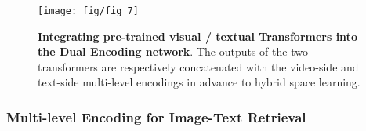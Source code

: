 \begin{figure}[tb!]
\centering\texttt{[image: fig/fig\_7]}
\vspace{-3mm}
\caption{\textbf{Integrating pre-trained visual / textual Transformers into the Dual Encoding network}. The outputs of the two transformers are respectively concatenated with the video-side and text-side multi-level encodings in advance to hybrid space learning. }\label{fig:with_transformer}
\end{figure}




\subsubsection{Multi-level Encoding for Image-Text Retrieval}


\begin{table} [tb!]
\renewcommand{\arraystretch}{1.2}
\caption{\textbf{Performance of image-text retrieval on Flickr30k and MSCOCO}. The proposed text-side multi-level encoding (MLE) is beneficial for VSE++~\cite{faghri2017vse}.}\vspace{-3mm}
\label{tab:image-text}
\centering 
{}\end{table}


